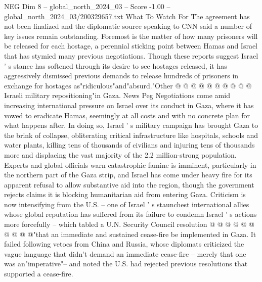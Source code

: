 \begin{textsample}{NEG Dim 8 – global\_north\_2024\_03 – Score -1.00 – global\_north\_2024\_03/200329657.txt}
What To Watch For The agreement has not been finalized and the diplomatic source speaking to CNN said a number of key issues remain outstanding.
Foremost is the matter of how many prisoners will be released for each hostage, a perennial sticking point between Hamas and Israel that has stymied many previous negotiations.
Though these reports suggest Israel ' s stance has softened through its desire to see hostages released, it has aggressively dismissed previous demands to release hundreds of prisoners in exchange for hostages as"ridiculous"and"absurd."Other @ @ @ @ @ @ @ @ @ @ Israeli military repositioning"in Gaza.
News Peg Negotiations come amid increasing international pressure on Israel over its conduct in Gaza, where it has vowed to eradicate Hamas, seemingly at all costs and with no concrete plan for what happens after.
In doing so, Israel ' s military campaign has brought Gaza to the brink of collapse, obliterating critical infrastructure like hospitals, schools and water plants, killing tens of thousands of civilians and injuring tens of thousands more and displacing the vast majority of the 2.2 million-strong population.
Experts and global officials warn catastrophic famine is imminent, particularly in the northern part of the Gaza strip, and Israel has come under heavy fire for its apparent refusal to allow substantive aid into the region, though the government rejects claims it is blocking humanitarian aid from entering Gaza.
Criticism is now intensifying from the U.S. -- one of Israel ' s staunchest international allies whose global reputation has suffered from its failure to condemn Israel ' s actions more forcefully -- which tabled a U.N.
Security Council resolution @ @ @ @ @ @ @ @ @ @"that an immediate and sustained cease-fire be implemented in Gaza.
It failed following vetoes from China and Russia, whose diplomats criticized the vague language that didn't demand an immediate cease-fire -- merely that one was an"imperative"-- and noted the U.S. had rejected previous resolutions that supported a cease-fire.

\end{textsample}
